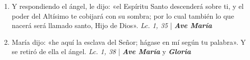 \documentclass[../../devocionario.tex]{subfiles}
\begin{document}
\begin{enumerate}
        \item Y respondiendo el ángel, le dijo: «el Espíritu Santo descenderá sobre ti, y el poder del Altísimo te cobijará con su sombra; 
                por lo cual también lo que nacerá será llamado santo, Hijo de Dios». \textit{Lc. 1, 35} | \textbf{\textit{Ave María}}

        \item María dijo: «he aquí la esclava del Señor; hágase en mí según tu palabra». Y se retiró de ella el ángel. \textit{Lc. 1, 38} 
                | \textbf{\textit{Ave María}} y \textbf{\textit{Gloria}}

    \end{enumerate}
\end{document}
